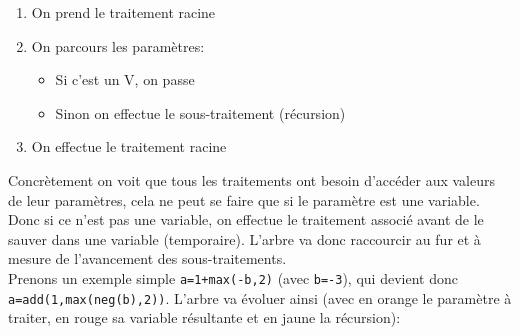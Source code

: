 \documentclass[french]{article}
\begin{document}
				\begin{enumerate}
					\item On prend le traitement racine
					\item On parcours les paramètres:
					\begin{itemize}
						\item Si c'est un V, on passe
						\item Sinon on effectue le sous-traitement (récursion)
					\end{itemize}
					\item On effectue le traitement racine
				\end{enumerate}
				
				Concrètement on voit que tous les traitements ont besoin d'accéder aux valeurs de leur paramètres, cela ne peut se faire que si le paramètre est une variable. Donc si ce n'est pas une variable, on effectue le traitement associé avant de le sauver dans une variable (temporaire). L'arbre va donc raccourcir au fur et à mesure de l'avancement des sous-traitements.\\
				
				Prenons un exemple simple \texttt{a=1+max(-b,2)} (avec \texttt{b=-3}), qui devient donc \texttt{a=add(1,max(neg(b),2))}. L'arbre va évoluer ainsi (avec en orange le paramètre à traiter, en rouge sa variable résultante et en jaune la récursion):
				
\end{document}

